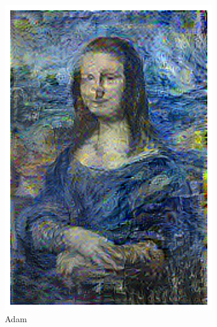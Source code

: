 \documentclass[a4paper,12pt]{article}
\begin{document}
\begin{figure}[H]
\begin{subfigure}{0.2\textwidth}
    \centering
    \includegraphics[width=\linewidth]{mona_van.png}
    \caption{Adam}
\end{subfigure}
\hfill
\begin{subfigure}{0.2\textwidth}
    \centering

\end{subfigure}
\end{figure}
\end{document}
